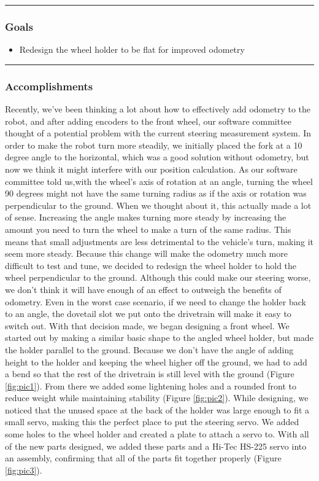 \noindent\hfil\rule{\textwidth}{.4pt}\hfil
\subsubsection*{Goals}
\begin{itemize}
    \item Redesign the wheel holder to be flat for improved odometry

\end{itemize} 

\noindent\hfil\rule{\textwidth}{.4pt}\hfil

\subsubsection*{Accomplishments}
Recently, we’ve been thinking a lot about how to effectively add odometry to the robot, and after adding encoders to the front wheel, our software committee thought of a potential problem with the current steering measurement system. In order to make the robot turn more steadily, we initially placed the fork at a 10 degree angle to the horizontal, which was a good solution without odometry, but now we think it might interfere with our position calculation. As our software committee told us,with the wheel’s axis of rotation at an angle, turning the wheel 90 degrees might not have the same turning radius as if the axis or rotation was perpendicular to the ground. When we thought about it, this actually made a lot of sense. Increasing the angle makes turning more steady by increasing the amount you need to turn the wheel to make a turn of the same radius. This means that small adjustments are less detrimental to the vehicle's turn, making it seem more steady. Because this change will make the odometry much more difficult to test and tune, we decided to redesign the wheel holder to hold the wheel perpendicular to the ground. Although this could make our steering worse, we don’t think it will have enough of an effect to outweigh the benefits of odometry. Even in the worst case scenario, if we need to change the holder back to an angle, the dovetail slot we put onto the drivetrain will make it easy to switch out.
With that decision made, we began designing a front wheel. We started out by making a similar basic shape to the angled wheel holder, but made the holder parallel to the ground. Because we don't have the angle of adding height to the holder and keeping the wheel higher off the ground, we had to add a bend so that the rest of the drivetrain is still level with the ground (Figure \ref{fig:pic1}). From there we added some lightening holes and a rounded front to reduce weight while maintaining stability (Figure \ref{fig:pic2}). While designing, we noticed that the unused space at the back of the holder was large enough to fit a small servo, making this the perfect place to put the steering servo. We added some holes to the wheel holder and created a plate to attach a servo to. With all of the new parts designed, we added these parts and a Hi-Tec HS-225 servo into an assembly, confirming that all of the parts fit together properly (Figure \ref{fig:pic3}).

